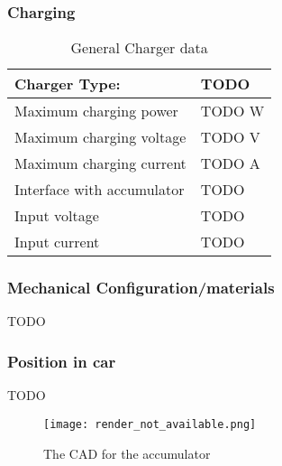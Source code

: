 \documentclass{article}
\begin{document}
\subsubsection{Charging}

	\begin{table}[H]
	    \centering
	    \begin{tabular}{|l|l|}
	        \hline
	        Charger Type: & TODO \\ \hline
	        Maximum charging power & TODO W \\ \hline
	        Maximum charging voltage & TODO V \\ \hline
	        Maximum charging current & TODO A \\ \hline
	        Interface with accumulator & TODO \\ \hline
	        Input voltage & TODO \\ \hline
	        Input current & TODO \\ \hline
	    \end{tabular}
	    \caption{General Charger data}
	    \label{charger}
	\end{table}

\subsubsection{Mechanical Configuration/materials}
TODO

\subsubsection{Position in car}
TODO

\begin{figure} [!ht]
	\centering  %
	
	\texttt{[image: render\_not\_available.png]}
	
	\caption{The CAD for the accumulator}
	
	\label{fig:accumulator_cad}
\end{figure}
\end{document}

